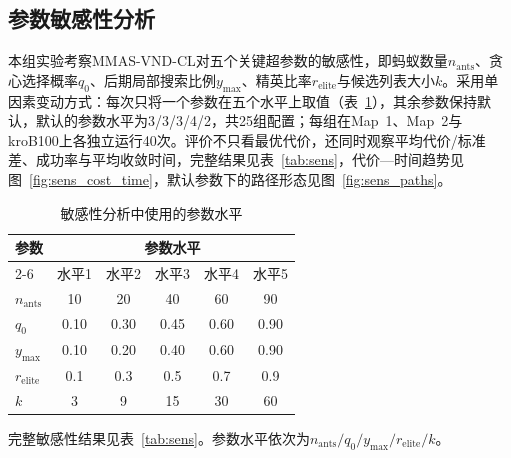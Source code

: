 \documentclass[lettersize,journal]{IEEEtran}
\begin{document}
\subsection{参数敏感性分析}
\label{subsec:exp_sens}
本组实验考察MMAS-VND-CL对五个关键超参数的敏感性，即蚂蚁数量$n_{\mathrm{ants}}$、贪心选择概率$q_0$、后期局部搜索比例$y_{\max}$、精英比率$r_{\mathrm{elite}}$与候选列表大小$k$。采用单因素变动方式：每次只将一个参数在五个水平上取值（表~\textcolor{blue}{\ref{tab:levels}}），其余参数保持默认，默认的参数水平为3/3/3/4/2，共25组配置；每组在Map~1、Map~2与kroB100上各独立运行40次。评价不只看最优代价，还同时观察平均代价/标准差、成功率与平均收敛时间，完整结果见表~\textcolor{blue}{\ref{tab:sens}}，代价—时间趋势见图~\textcolor{blue}{\ref{fig:sens_cost_time}}，默认参数下的路径形态见图~\textcolor{blue}{\ref{fig:sens_paths}}。
\begin{table}[!t]
\caption{敏感性分析中使用的参数水平}
\label{tab:levels}
\centering
\begin{tabular}{lccccc}
\toprule
\multirow{2}{*}{参数} & \multicolumn{5}{c}{参数水平} \\
\cmidrule(lr){2-6}
 & 水平1 & 水平2 & 水平3 & 水平4 & 水平5 \\
\midrule
$n_{\mathrm{ants}}$ & 10 & 20 & 40 & 60 & 90 \\
$q_0$ & 0.10 & 0.30 & 0.45 & 0.60 & 0.90 \\
$y_{\max}$ & 0.10 & 0.20 & 0.40 & 0.60 & 0.90 \\
$r_{\mathrm{elite}}$ & 0.1 & 0.3 & 0.5 & 0.7 & 0.9 \\
$k$ & 3 & 9 & 15 & 30 & 60 \\
\bottomrule
\end{tabular}
\end{table}
完整敏感性结果见表~\textcolor{blue}{\ref{tab:sens}}。参数水平依次为$n_{\mathrm{ants}}/q_0/y_{\max}/r_{\mathrm{elite}}/k$。
\end{document}
